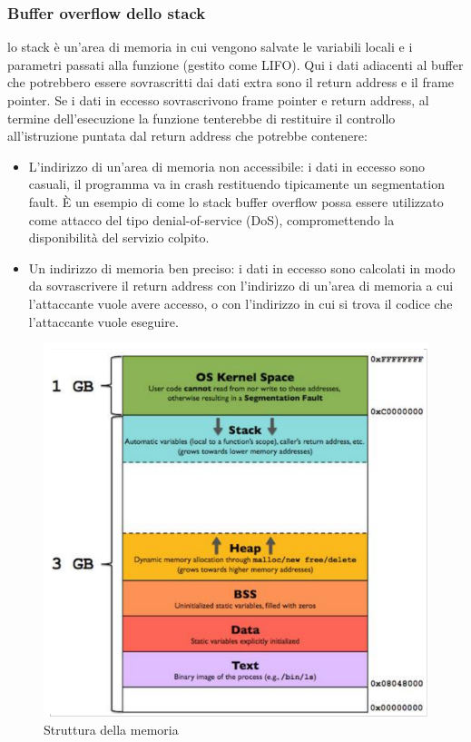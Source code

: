 \documentclass[8pt]{extarticle}
\begin{document}
\subsubsection{Buffer overflow dello stack}
lo stack è un’area di memoria in cui vengono salvate le variabili locali e i parametri passati alla funzione 
(gestito come LIFO). Qui i dati adiacenti al buffer che potrebbero essere sovrascritti dai dati extra sono 
il return address e il frame pointer. Se i dati in eccesso sovrascrivono frame pointer e return address, 
al termine dell’esecuzione la funzione tenterebbe di restituire il controllo all’istruzione puntata dal 
return address che potrebbe contenere:
\begin{itemize}
    \item L’indirizzo di un’area di memoria non accessibile: i dati in eccesso sono casuali, il programma 
    va in crash restituendo tipicamente un segmentation fault. È un esempio di come lo stack buffer 
    overflow possa essere utilizzato come attacco del tipo denial-of-service (DoS), compromettendo la 
    disponibilità del servizio colpito.
    \item Un indirizzo di memoria ben preciso: i dati in eccesso sono calcolati in modo da sovrascrivere 
    il return address con l’indirizzo di un’area di memoria a cui l’attaccante vuole avere accesso, o con 
    l’indirizzo in cui si trova il codice che l’attaccante vuole eseguire.
\end{itemize}
\begin{figure}[H]
    \center
    \includegraphics[scale=0.2]{images/BO2.png}
    \caption{Struttura della memoria}\label{fig:1}
\end{figure}
\pagebreak
\end{document}
